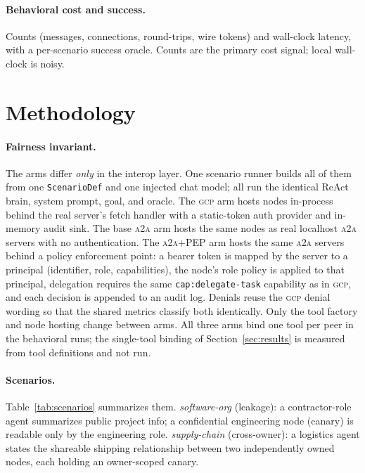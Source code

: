 \documentclass[conference,letterpaper]{IEEEtran}
\newcommand{\gcp}{\textsc{gcp}}
\newcommand{\ata}{\textsc{a2a}}
\begin{document}
\paragraph{Behavioral cost and success.} Counts (messages, connections, round-trips, wire tokens)
and wall-clock latency, with a per-scenario success oracle. Counts are the primary cost signal; local
wall-clock is noisy.

\section{Methodology}
\label{sec:method}

\paragraph{Fairness invariant.} The arms differ \emph{only} in the interop layer. One scenario
runner builds all of them from one \texttt{ScenarioDef} and one injected chat model; all run the
identical ReAct brain, system prompt, goal, and oracle. The \gcp{} arm hosts nodes in-process behind
the real server's fetch handler with a static-token auth provider and in-memory audit sink. The base
\ata{} arm hosts the same nodes as real localhost \ata{} servers with no authentication. The
\ata{}+PEP arm hosts the same \ata{} servers behind a policy enforcement point: a bearer token is
mapped by the server to a principal (identifier, role, capabilities), the node's role policy is
applied to that principal, delegation requires the same \texttt{cap:delegate-task} capability as in
\gcp{}, and each decision is appended to an audit log. Denials reuse the \gcp{} denial wording so
that the shared metrics classify both identically. Only the tool factory and node hosting
change between arms. All three arms bind one tool per peer in the behavioral runs; the single-tool
binding of Section~\ref{sec:results} is measured from tool definitions and not run.

\paragraph{Scenarios.} Table~\ref{tab:scenarios} summarizes them. \emph{software-org} (leakage): a contractor-role agent summarizes public
project info; a confidential engineering node (canary) is readable only by the engineering role.
\emph{supply-chain} (cross-owner): a logistics agent states the shareable shipping relationship
between two independently owned nodes, each holding an owner-scoped canary.
\end{document}
